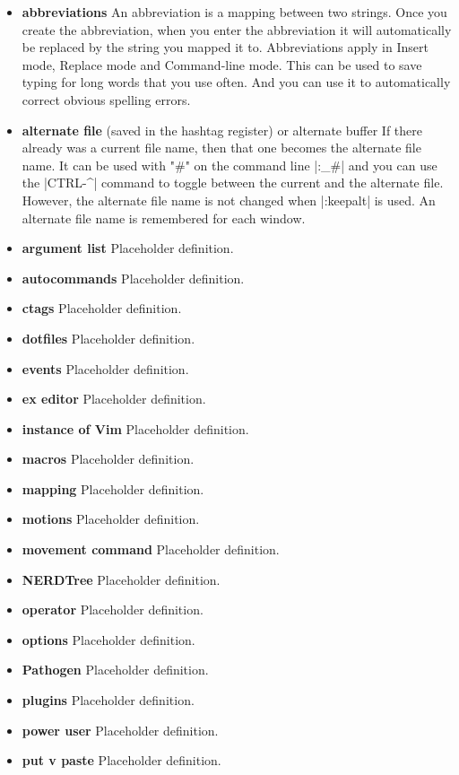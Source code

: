 \documentclass[12pt, oneside]{book}
\begin{document}
\begin{itemize}[leftmargin=*, label={}]
  \item \textbf{abbreviations} An abbreviation is a mapping between two strings.  Once you create the abbreviation, when you enter the abbreviation it will automatically be replaced by the string you mapped it to.  Abbreviations apply in Insert mode, Replace mode and Command-line mode.  This can be used to save typing for long words that you use often.  And you can use it to automatically correct obvious spelling errors.
  \item \textbf{alternate file} (saved in the hashtag register) or alternate buffer
If there already was a current file name, then that one becomes the alternate
file name.  It can be used with "#" on the command line |:_#| and you can use
the |CTRL-^| command to toggle between the current and the alternate file.
However, the alternate file name is not changed when |:keepalt| is used.
An alternate file name is remembered for each window.
  \item \textbf{argument list} Placeholder definition.
  \item \textbf{autocommands} Placeholder definition.
  \item \textbf{ctags} Placeholder definition.
  \item \textbf{dotfiles} Placeholder definition.
  \item \textbf{events} Placeholder definition.
  \item \textbf{ex editor} Placeholder definition.
  \item \textbf{instance of Vim} Placeholder definition.
  \item \textbf{macros} Placeholder definition.
  \item \textbf{mapping} Placeholder definition.
  \item \textbf{motions} Placeholder definition.
  \item \textbf{movement command} Placeholder definition.
  \item \textbf{NERDTree} Placeholder definition.
  \item \textbf{operator} Placeholder definition.
  \item \textbf{options} Placeholder definition.
  \item \textbf{Pathogen} Placeholder definition.
  \item \textbf{plugins} Placeholder definition.
  \item \textbf{power user} Placeholder definition.
  \item \textbf{put v paste} Placeholder definition.

\end{itemize}
\end{document}
